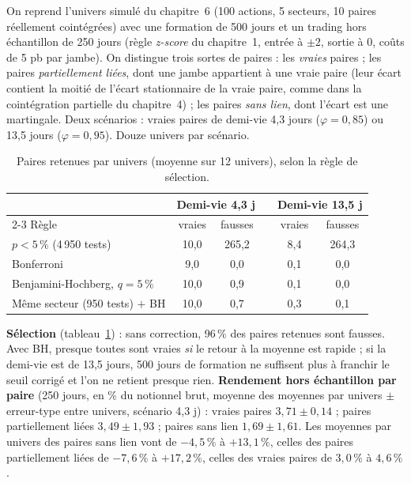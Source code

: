 On reprend l'univers simulé du chapitre~6 (100 actions, 5 secteurs, 10 paires réellement cointégrées) avec une formation de 500 jours et un trading hors échantillon de 250 jours (règle \emph{z-score} du chapitre~1, entrée à $\pm2$, sortie à 0, coûts de 5 pb par jambe). On distingue trois sortes de paires : les \emph{vraies} paires ; les paires \emph{partiellement liées}, dont une jambe appartient à une vraie paire (leur écart contient la moitié de l'écart stationnaire de la vraie paire, comme dans la cointégration partielle du chapitre~4) ; les paires \emph{sans lien}, dont l'écart est une martingale. Deux scénarios : vraies paires de demi-vie 4,3 jours ($\varphi = 0{,}85$) ou 13,5 jours ($\varphi = 0{,}95$). Douze univers par scénario.

\begin{table}[h]
\centering\small
\caption{Paires retenues par univers (moyenne sur 12 univers), selon la règle de sélection.}
\label{c7:tab:sel}
\begin{tabular}{lccccc}
\toprule
 & \multicolumn{2}{c}{Demi-vie 4,3 j} & & \multicolumn{2}{c}{Demi-vie 13,5 j}\\
\cmidrule{2-3}\cmidrule{5-6}
Règle & vraies & fausses & & vraies & fausses \\
\midrule
$p<5\,\%$ (4\,950 tests) & 10,0 & 265,2 & & 8,4 & 264,3 \\
Bonferroni & 9,0 & 0,0 & & 0,1 & 0,0 \\
Benjamini-Hochberg, $q = 5\,\%$ & 10,0 & 0,9 & & 0,1 & 0,0 \\
Même secteur (950 tests) $+$ BH & 10,0 & 0,7 & & 0,3 & 0,1 \\
\bottomrule
\end{tabular}
\end{table}

\begin{codebox}
\textbf{Sélection} (tableau~\ref{c7:tab:sel}) : sans correction, 96\,\% des paires retenues sont fausses. Avec BH, presque toutes sont vraies \emph{si} le retour à la moyenne est rapide ; si la demi-vie est de 13,5 jours, 500 jours de formation ne suffisent plus à franchir le seuil corrigé et l'on ne retient presque rien. \textbf{Rendement hors échantillon par paire} (250 jours, en \% du notionnel brut, moyenne des moyennes par univers $\pm$ erreur-type entre univers, scénario 4,3 j) : vraies paires $3{,}71 \pm 0{,}14$ ; paires partiellement liées $3{,}49 \pm 1{,}93$ ; paires sans lien $1{,}69 \pm 1{,}61$. Les moyennes par univers des paires sans lien vont de $-4{,}5\,\%$ à $+13{,}1\,\%$, celles des paires partiellement liées de $-7{,}6\,\%$ à $+17{,}2\,\%$, celles des vraies paires de $3{,}0\,\%$ à $4{,}6\,\%$.
\end{codebox}

